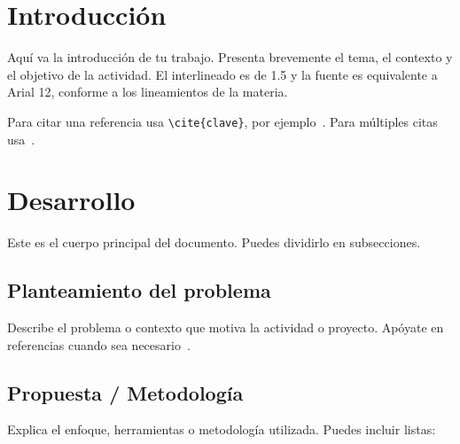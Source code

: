 \documentclass[12pt, letterpaper]{article}
\begin{document}
\setcounter{page}{1}
\renewcommand{\contentsname}{Índice de Contenido}
\tableofcontents
\newpage

\setcounter{page}{1}
\justifying


\section{Introducción}

Aquí va la introducción de tu trabajo. Presenta brevemente el tema, el contexto y el objetivo de la actividad. El interlineado es de 1.5 y la fuente es equivalente a Arial 12, conforme a los lineamientos de la materia.

Para citar una referencia usa \verb|\cite{clave}|, por ejemplo~\cite{ejemplo_articulo}. Para múltiples citas usa~\cite{ejemplo_libro, ejemplo_conferencia}.

\section{Desarrollo}

Este es el cuerpo principal del documento. Puedes dividirlo en subsecciones.

\subsection{Planteamiento del problema}

Describe el problema o contexto que motiva la actividad o proyecto. Apóyate en referencias cuando sea necesario~\cite{ejemplo_tesis}.

\subsection{Propuesta / Metodología}

Explica el enfoque, herramientas o metodología utilizada. Puedes incluir listas:
\end{document}

